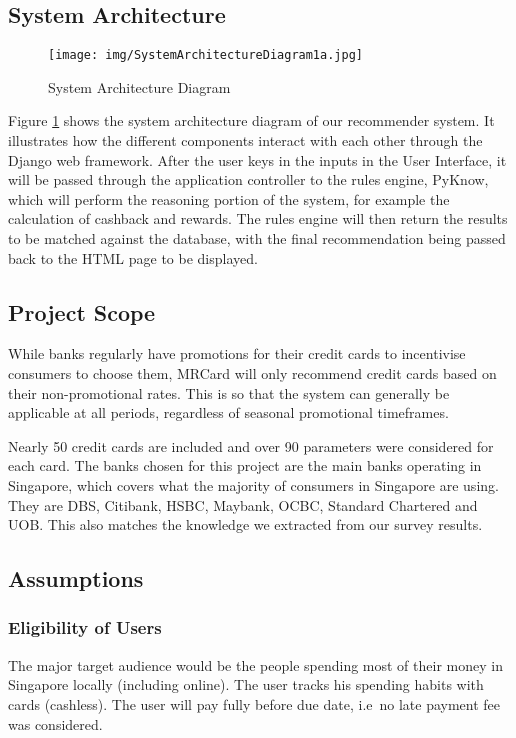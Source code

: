 \subsection{System Architecture} %
\label{sub:system_architecture}
	\begin{figure}[h]
		\centering
		\texttt{[image: img/SystemArchitectureDiagram1a.jpg]}
		\caption{System Architecture Diagram}
		\label{fig:system_architecture_diagram}
	\end{figure}
	Figure \ref{fig:system_architecture_diagram} shows the system architecture diagram of our recommender system. It illustrates how the different components interact with each other through the Django web framework. After the user keys in the inputs in the User Interface, it will be passed through the application controller to the rules engine, PyKnow, which will perform the reasoning portion of the system, for example the calculation of cashback and rewards. The rules engine will then return the results to be matched against the database, with the final recommendation being passed back to the HTML page to be displayed.


\subsection{Project Scope} %
\label{sub:project_scope}
While banks regularly have promotions for their credit cards to incentivise consumers to choose them, MRCard will only recommend credit cards based on their non-promotional rates. This is so that the system can generally be applicable at all periods, regardless of seasonal promotional timeframes.

Nearly 50 credit cards are included and over 90 parameters were considered for each card. The banks chosen for this project are the main banks operating in Singapore, which covers what the majority of consumers in Singapore are using. They are DBS, Citibank, HSBC, Maybank, OCBC, Standard Chartered and UOB. This also matches the knowledge we extracted from our survey results.


\subsection{Assumptions} %
\label{sub:assumptions}

	\subsubsection{Eligibility of Users} %
	\label{ssub:eligibility_of_users}
	The major target audience would be the people spending most of their money in Singapore locally (including online). The user tracks his spending habits with cards (cashless). The user will pay fully before due date, i.e\ no late payment fee was considered.


